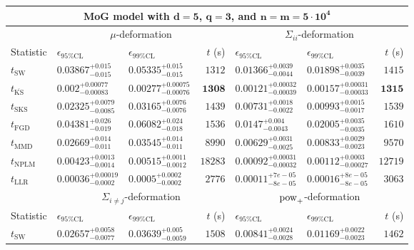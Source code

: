 \begin{tabular}{l|llr|llr}
	\toprule
	\multicolumn{7}{c}{{\bf MoG model with $\mathbf{d=5}$, $\mathbf{q=3}$, and $\mathbf{n=m=5\cdot 10^{4}}$}} \\
	\toprule
	\multicolumn{1}{c}{} & \multicolumn{3}{c}{$\mu$-deformation} & \multicolumn{3}{c}{$\Sigma_{ii}$-deformation} \\
	Statistic & $\epsilon_{95\%\mathrm{CL}}$ & $\epsilon_{99\%\mathrm{CL}}$ & $t$ (s) & $\epsilon_{95\%\mathrm{CL}}$ & $\epsilon_{99\%\mathrm{CL}}$ & $t$ (s) \\
	\midrule
	$t_{\mathrm{SW}}$ & $0.03867_{-0.015}^{+0.015}$ & $0.05335_{-0.015}^{+0.015}$ & $1312$ & $0.01366_{-0.0044}^{+0.0039}$ & $0.01898_{-0.0039}^{+0.0035}$ & $1415$ \\
	$t_{\overline{\mathrm{KS}}}$ & ${\mathbf{0.002_{-0.00083}^{+0.00077}}}$ & ${\mathbf{0.00277_{-0.00076}^{+0.00075}}}$ & ${\mathbf{1308}}$ & ${\mathbf{0.00121_{-0.00039}^{+0.00032}}}$ & ${\mathbf{0.00157_{-0.00033}^{+0.00031}}}$ & ${\mathbf{1315}}$ \\
	$t_{\mathrm{SKS}}$ & $0.02325_{-0.0085}^{+0.0079}$ & $0.03165_{-0.0076}^{+0.0076}$ & $1439$ & $0.00731_{-0.0022}^{+0.0018}$ & $0.00993_{-0.0017}^{+0.0015}$ & $1539$ \\
	$t_{\mathrm{FGD}}$ & $0.04381_{-0.019}^{+0.026}$ & $0.06082_{-0.018}^{+0.024}$ & $1536$ & $0.0147_{-0.0043}^{+0.004}$ & $0.02005_{-0.0035}^{+0.0035}$ & $1610$ \\
	$t_{\mathrm{MMD}}$ & $0.02669_{-0.011}^{+0.014}$ & $0.03545_{-0.011}^{+0.014}$ & $8990$ & $0.00629_{-0.0025}^{+0.0031}$ & $0.00833_{-0.0023}^{+0.0029}$ & $9570$ \\
\rowcolor{red!35}	$t_{\mathrm{NPLM}}$ & $0.00423_{-0.0014}^{+0.0013}$ & $0.00515_{-0.0012}^{+0.0011}$ & $18283$ & $0.00092_{-0.00032}^{+0.00031}$ & $0.00112_{-0.00027}^{+0.0003}$ & $12719$ \\
	$t_{\mathrm{LLR}}$ & $0.00036_{-0.0002}^{+0.00019}$ & $0.0005_{-0.0002}^{+0.0002}$ & $2776$ & $0.00011_{-8e-05}^{+7e-05}$ & $0.00016_{-8e-05}^{+8e-05}$ & $3063$ \\
	\toprule
	\multicolumn{1}{c}{} & \multicolumn{3}{c}{$\Sigma_{i\neq j}$-deformation} & \multicolumn{3}{c}{$\rm{pow}_{+}$-deformation} \\
	Statistic & $\epsilon_{95\%\mathrm{CL}}$ & $\epsilon_{99\%\mathrm{CL}}$ & $t$ (s) & $\epsilon_{95\%\mathrm{CL}}$ & $\epsilon_{99\%\mathrm{CL}}$ & $t$ (s) \\
	\midrule
	$t_{\mathrm{SW}}$ & $0.02657_{-0.0077}^{+0.0058}$ & $0.03639_{-0.0059}^{+0.005}$ & $1508$ & $0.00841_{-0.0028}^{+0.0024}$ & $0.01169_{-0.0023}^{+0.0022}$ & $1462$ \\

\end{tabular}

